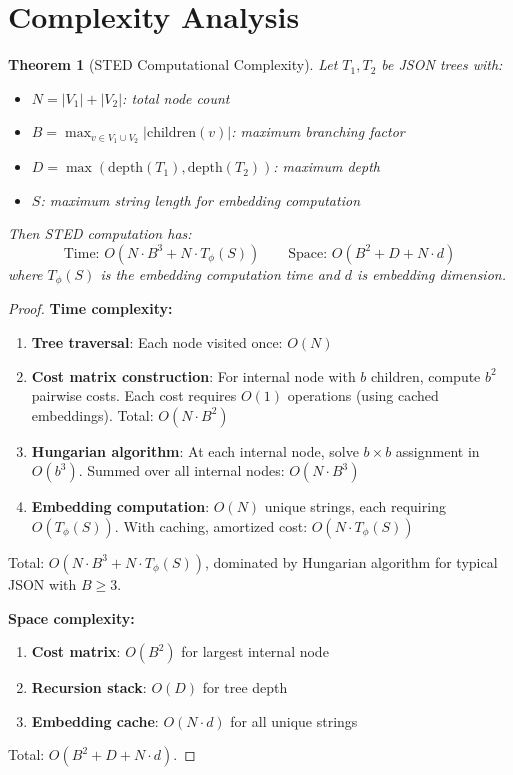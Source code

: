 \documentclass{article}
\newtheorem{theorem}{Theorem}
\begin{document}
\section{Complexity Analysis}

\begin{theorem}[STED Computational Complexity]
\label{thm:complexity}
Let $T_1, T_2$ be JSON trees with:
\begin{itemize}
    \item $N = |V_1| + |V_2|$: total node count
    \item $B = \max_{v \in V_1 \cup V_2} |\text{children}(v)|$: maximum branching factor
    \item $D = \max(\text{depth}(T_1), \text{depth}(T_2))$: maximum depth
    \item $S$: maximum string length for embedding computation
\end{itemize}

Then STED computation has:
\begin{equation}
    \text{Time: } O(N \cdot B^3 + N \cdot T_\phi(S)) \qquad \text{Space: } O(B^2 + D + N \cdot d)
\end{equation}
where $T_\phi(S)$ is the embedding computation time and $d$ is embedding dimension.
\end{theorem}

\begin{proof}
\textbf{Time complexity:}
\begin{enumerate}
    \item \textbf{Tree traversal}: Each node visited once: $O(N)$
    \item \textbf{Cost matrix construction}: For internal node with $b$ children, compute $b^2$ pairwise costs. Each cost requires $O(1)$ operations (using cached embeddings). Total: $O(N \cdot B^2)$
    \item \textbf{Hungarian algorithm}: At each internal node, solve $b \times b$ assignment in $O(b^3)$. Summed over all internal nodes: $O(N \cdot B^3)$
    \item \textbf{Embedding computation}: $O(N)$ unique strings, each requiring $O(T_\phi(S))$. With caching, amortized cost: $O(N \cdot T_\phi(S))$
\end{enumerate}

Total: $O(N \cdot B^3 + N \cdot T_\phi(S))$, dominated by Hungarian algorithm for typical JSON with $B \geq 3$.

\textbf{Space complexity:}
\begin{enumerate}
    \item \textbf{Cost matrix}: $O(B^2)$ for largest internal node
    \item \textbf{Recursion stack}: $O(D)$ for tree depth
    \item \textbf{Embedding cache}: $O(N \cdot d)$ for all unique strings
\end{enumerate}

Total: $O(B^2 + D + N \cdot d)$.
\end{proof}
\end{document}
